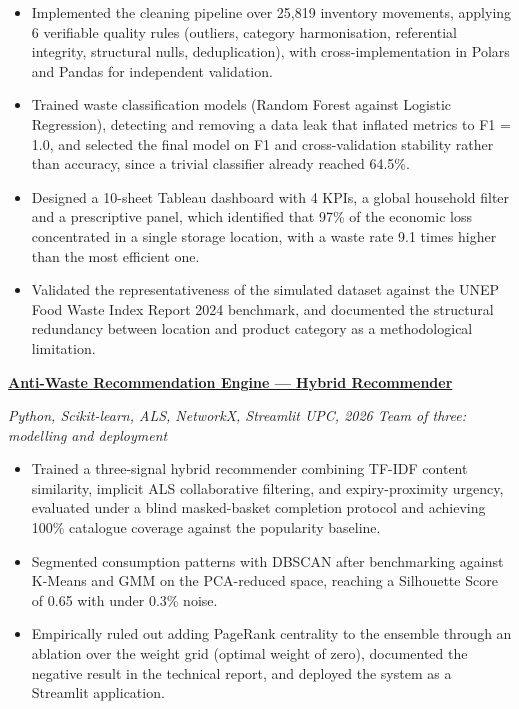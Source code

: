 \documentclass[10pt,letterpaper]{article}
\newcommand{\entry}[2]{%
    \vspace{0.55ex}
    \textbf{#1}\par
    {\small\itshape\color{muted}#2}\par
    \vspace{0.15ex}
}
\newenvironment{points}
{
    \begin{itemize}[
        leftmargin=1.25em,
        itemsep=0.18ex,
        parsep=0pt,
        topsep=0.25ex,
        label=\textbullet
    ]
}
{
    \end{itemize}
}
\begin{document}
\begin{points}
    \item Implemented the cleaning pipeline over 25,819 inventory movements,
    applying 6 verifiable quality rules (outliers, category harmonisation,
    referential integrity, structural nulls, deduplication), with
    cross-implementation in Polars and Pandas for independent validation.

    \item Trained waste classification models (Random Forest against Logistic
    Regression), detecting and removing a data leak that inflated metrics to
    F1 = 1.0, and selected the final model on F1 and cross-validation stability
    rather than accuracy, since a trivial classifier already reached 64.5\%.

    \item Designed a 10-sheet Tableau dashboard with 4 KPIs, a global household
    filter and a prescriptive panel, which identified that 97\% of the
    economic loss concentrated in a single storage location, with a waste rate
    9.1 times higher than the most efficient one.

    \item Validated the representativeness of the simulated dataset against
    the UNEP Food Waste Index Report 2024 benchmark, and documented the
    structural redundancy between location and product category as a
    methodological limitation.
\end{points}


\entry
{\href{https://portfolio-ztanq.vercel.app/projects/ski-recommender}
{Anti-Waste Recommendation Engine --- Hybrid Recommender}}
{Python, Scikit-learn, ALS, NetworkX, Streamlit
\textbar{} UPC, 2026
\textbar{} Team of three: modelling and deployment}

\begin{points}
    \item Trained a three-signal hybrid recommender combining TF-IDF content
    similarity, implicit ALS collaborative filtering, and expiry-proximity
    urgency, evaluated under a blind masked-basket completion protocol and
    achieving 100\% catalogue coverage against the popularity baseline.

    \item Segmented consumption patterns with DBSCAN after benchmarking against
    K-Means and GMM on the PCA-reduced space, reaching a Silhouette Score of
    0.65 with under 0.3\% noise.

    \item Empirically ruled out adding PageRank centrality to the ensemble
    through an ablation over the weight grid (optimal weight of zero),
    documented the negative result in the technical report, and deployed the
    system as a Streamlit application.
\end{points}
\end{document}
